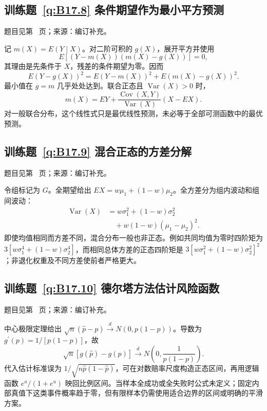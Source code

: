 \subsection*{训练题~\ref{q:B17.8} 条件期望作为最小平方预测}\label{a:B17.8}{\small 题目见第~\pageref{q:B17.8} 页；来源：编订补充。}
\begin{solve}记 $m(X)=E(Y\mid X)$。对二阶可积的 $g(X)$，展开平方并使用\[E[(Y-m(X))(m(X)-g(X))]=0,\]其理由是先条件于 $X$，残差的条件期望为零。因而\[E(Y-g(X))^2=E(Y-m(X))^2+E(m(X)-g(X))^2.\]最小值在 $g=m$ 几乎处处达到。联合正态且 $\operatorname{Var}(X)>0$ 时，\[m(X)=EY+\frac{\operatorname{Cov}(X,Y)}{\operatorname{Var}(X)}(X-EX).\]对一般联合分布，这个线性式只是最优线性预测，未必等于全部可测函数中的最优预测。\end{solve}

\subsection*{训练题~\ref{q:B17.9} 混合正态的方差分解}\label{a:B17.9}{\small 题目见第~\pageref{q:B17.9} 页；来源：编订补充。}
\begin{solve}令组标记为 $G$。全期望给出 $EX=w\mu_1+(1-w)\mu_2$。全方差分为组内波动和组间波动：\[\begin{aligned}\operatorname{Var}(X)&=w\sigma_1^2+(1-w)\sigma_2^2\\&\quad+w(1-w)(\mu_1-\mu_2)^2.\end{aligned}\]即使均值相同而方差不同，混合分布一般也非正态。例如共同均值为零时四阶矩为 $3[w\sigma_1^4+(1-w)\sigma_2^4]$，而相同总体方差的正态四阶矩是 $3[w\sigma_1^2+(1-w)\sigma_2^2]^2$；非退化权重及不同方差使前者严格更大。\end{solve}

\subsection*{训练题~\ref{q:B17.10} 德尔塔方法估计风险函数}\label{a:B17.10}{\small 题目见第~\pageref{q:B17.10} 页；来源：编订补充。}
\begin{solve}中心极限定理给出 $\sqrt n(\widehat p-p)\xrightarrow dN(0,p(1-p))$。导数为 $g^{\prime}(p)=1/[p(1-p)]$，故\[\sqrt n[g(\widehat p)-g(p)]\xrightarrow dN\left(0,\frac1{p(1-p)}\right).\]代入估计标准误为 $1/\sqrt{n\widehat p(1-\widehat p)}$，可在对数赔率尺度构造正态区间，再用逻辑函数 $e^u/(1+e^u)$ 映回比例区间。当样本全成功或全失败时公式未定义；固定内部真值下这类事件概率趋于零，但有限样本仍需使用适合边界的区间或明确的平滑方案。\end{solve}

